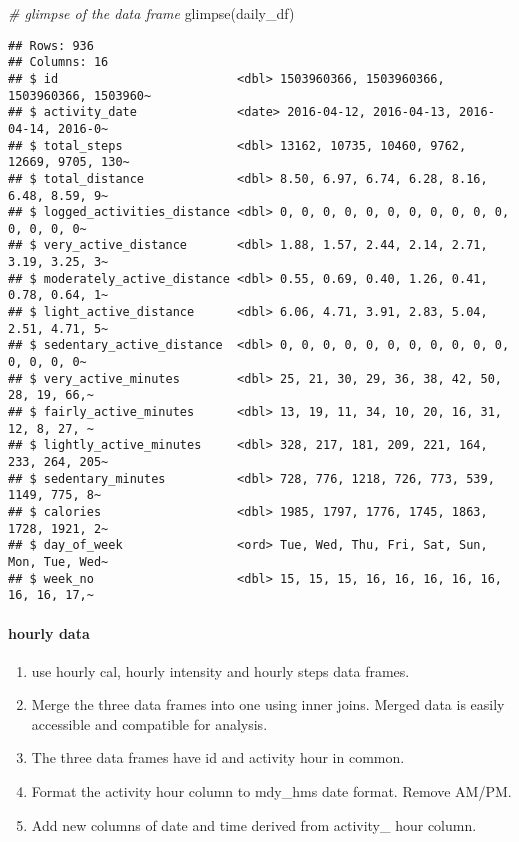 \documentclass[
]{article}
\newenvironment{Shaded}{\begin{snugshade}}{\end{snugshade}}
\newcommand{\CommentTok}[1]{\textcolor[rgb]{0.56,0.35,0.01}{\textit{#1}}}
\newcommand{\FunctionTok}[1]{\textcolor[rgb]{0.00,0.00,0.00}{#1}}
\newcommand{\NormalTok}[1]{#1}
\begin{document}
\begin{Shaded}
\begin{Highlighting}[]
\CommentTok{\# glimpse of the data frame}
\FunctionTok{glimpse}\NormalTok{(daily\_df)}
\end{Highlighting}
\end{Shaded}

\begin{verbatim}
## Rows: 936
## Columns: 16
## $ id                         <dbl> 1503960366, 1503960366, 1503960366, 1503960~
## $ activity_date              <date> 2016-04-12, 2016-04-13, 2016-04-14, 2016-0~
## $ total_steps                <dbl> 13162, 10735, 10460, 9762, 12669, 9705, 130~
## $ total_distance             <dbl> 8.50, 6.97, 6.74, 6.28, 8.16, 6.48, 8.59, 9~
## $ logged_activities_distance <dbl> 0, 0, 0, 0, 0, 0, 0, 0, 0, 0, 0, 0, 0, 0, 0~
## $ very_active_distance       <dbl> 1.88, 1.57, 2.44, 2.14, 2.71, 3.19, 3.25, 3~
## $ moderately_active_distance <dbl> 0.55, 0.69, 0.40, 1.26, 0.41, 0.78, 0.64, 1~
## $ light_active_distance      <dbl> 6.06, 4.71, 3.91, 2.83, 5.04, 2.51, 4.71, 5~
## $ sedentary_active_distance  <dbl> 0, 0, 0, 0, 0, 0, 0, 0, 0, 0, 0, 0, 0, 0, 0~
## $ very_active_minutes        <dbl> 25, 21, 30, 29, 36, 38, 42, 50, 28, 19, 66,~
## $ fairly_active_minutes      <dbl> 13, 19, 11, 34, 10, 20, 16, 31, 12, 8, 27, ~
## $ lightly_active_minutes     <dbl> 328, 217, 181, 209, 221, 164, 233, 264, 205~
## $ sedentary_minutes          <dbl> 728, 776, 1218, 726, 773, 539, 1149, 775, 8~
## $ calories                   <dbl> 1985, 1797, 1776, 1745, 1863, 1728, 1921, 2~
## $ day_of_week                <ord> Tue, Wed, Thu, Fri, Sat, Sun, Mon, Tue, Wed~
## $ week_no                    <dbl> 15, 15, 15, 16, 16, 16, 16, 16, 16, 16, 17,~
\end{verbatim}

\hypertarget{hourly-data}{%
\paragraph{hourly data}\label{hourly-data}}

\begin{enumerate}
\def\labelenumi{\arabic{enumi}.}
\item
  use hourly cal, hourly intensity and hourly steps data frames.
\item
  Merge the three data frames into one using inner joins. Merged data is
  easily accessible and compatible for analysis.
\item
  The three data frames have id and activity hour in common.
\item
  Format the activity hour column to mdy\_hms date format. Remove AM/PM.
\item
  Add new columns of date and time derived from activity\_ hour column.
\end{enumerate}
\end{document}
